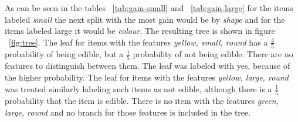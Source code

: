 \documentclass[11pt]{article}
\begin{document}
As can be seen in the tables ~\ref{tab:gain-small} and ~\ref{tab:gain-large} for the items labeled \emph{small} the next split with the most gain would be by \emph{shape} and for the items labeled large it would be \emph{colour}. The resulting tree is shown in figure ~\ref{fig:tree}. The leaf for items with the features \emph{yellow,  small, round} has a $\frac{4}{5}$ probability of being edible, but a $\frac{1}{5}$ probability of not being edible. There are no features to distinguish between them. The leaf was labeled with yes, because of the higher probability. The leaf for items with the features \emph{yellow,  large, round} was treated similarly labeling such items as not edible, although there is a $\frac{1}{5}$ probability that the item is edible. There is no item with the features \emph{green, large, round} and no branch for those features is included in the tree.



\end{document}
